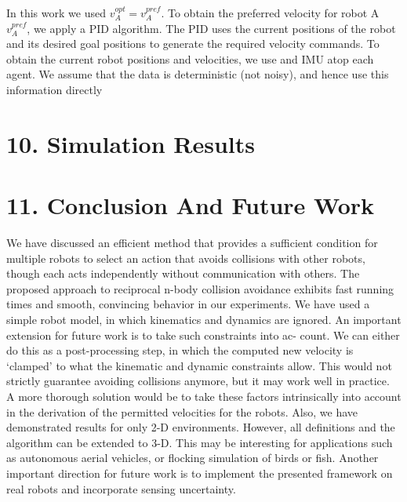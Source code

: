 \documentclass[12pt]{report}
\begin{document}
In this work we used $v^{opt}_{A} = v^{pref}_{A}$. To obtain the preferred velocity for robot A $v^{pref}_{A}$, we apply a PID algorithm. The PID uses the current positions of the robot and its desired goal positions to generate the required velocity commands. To obtain the current robot positions and velocities, we use and IMU atop each agent. We assume that the data is deterministic (not noisy), and hence use this information directly

\chapter*{10.  Simulation Results}

\chapter*{11.  Conclusion And Future Work}

We have discussed an efficient method that provides a sufficient condition for multiple robots to select an action that avoids collisions with other robots, though each acts independently without communication with others. The proposed approach to reciprocal n-body collision avoidance exhibits fast running times and smooth, convincing behavior in our experiments. We have used a simple robot model, in which kinematics and dynamics are ignored. An important extension for future work is to take such constraints into ac-
count. We can either do this as a post-processing step, in which the computed new
velocity is ‘clamped’ to what the kinematic and dynamic constraints allow. This
would not strictly guarantee avoiding collisions anymore, but it may work well in
practice. A more thorough solution would be to take these factors intrinsically
into account in the derivation of the permitted velocities for the robots. Also, we have demonstrated results for only 2-D environments. However, all definitions and the algorithm can be extended to 3-D. This may be interesting for applications such as autonomous aerial vehicles, or flocking simulation of birds or fish. Another important direction for future work is to implement the presented framework on real robots and incorporate sensing uncertainty.
\end{document}
